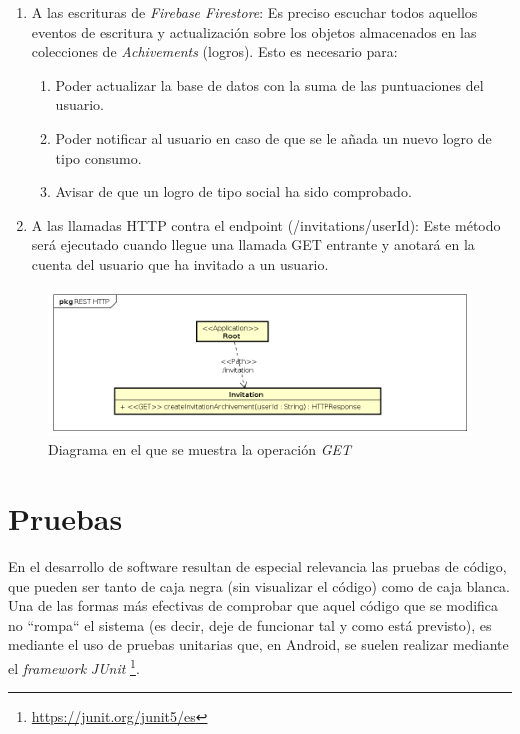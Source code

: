 \documentclass[twoside]{report}
\begin{document}
\begin{enumerate}
\item A las escrituras de \textit{Firebase Firestore}: Es preciso escuchar todos aquellos eventos de escritura y actualización sobre los objetos almacenados en las colecciones de \textit{Achivements} (logros). Esto es necesario para:
	\begin{enumerate}
		\item Poder actualizar la base de datos con la suma de las puntuaciones del usuario.
		\item Poder notificar al usuario en caso de que se le añada un nuevo logro de tipo consumo.
		\item Avisar de que un logro de tipo social ha sido comprobado.
	\end{enumerate}

\item A las llamadas HTTP contra el endpoint (/invitations/{userId}): Este método será ejecutado cuando llegue una llamada GET entrante y anotará en la cuenta del usuario que ha invitado a un usuario.
\end{enumerate}


\begin{figure}[H]
\centering
\includegraphics[width=\textwidth]{images/restAPI}
\caption{Diagrama en el que se muestra la operación \textit{GET}}
\end{figure}

\section{Pruebas}


En el desarrollo de software resultan de especial relevancia las pruebas de código, que pueden ser tanto de caja negra (sin visualizar el código) como de caja blanca. Una de las formas más efectivas de comprobar que aquel código que se modifica no “rompa“ el sistema (es decir, deje de funcionar tal y como está previsto), es mediante el uso de pruebas unitarias que, en Android, se suelen realizar mediante el \textit{framework} \textit{JUnit} \footnote{\url{https://junit.org/junit5/es}}. 
\end{document}
